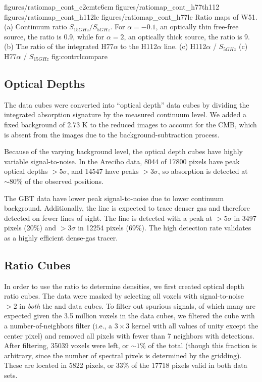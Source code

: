 \FigureFour
{figures/ratiomap_cont_c2cmtc6cm}
{figures/ratiomap_cont_h77th112}
{figures/ratiomap_cont_h112lc}
{figures/ratiomap_cont_h77lc}
{Ratio maps of W51.  
(a) Continuum ratio $S_{15 GHz} / S_{5 GHz}$.  For $\alpha=-0.1$, an optically
thin free-free source, the ratio is 0.9, while for $\alpha=2$, an optically thick source,
the ratio is 9.
(b) The ratio of the integrated H77$\alpha$ to the H112$\alpha$ line.
(c) H112$\alpha$ / $S_{5 GHz}$
(c) H77$\alpha$ / $S_{15 GHz}$
}
{fig:contrrlcompare}

\subsection{Optical Depths}

The data cubes were converted into ``optical depth'' data cubes by dividing the
integrated \formaldehyde absorption signature by the measured continuum level.
We added a fixed background of 2.73 K to the reduced images to account for the
CMB, which is absent from the images due to the background-subtraction
process.

Because of the varying background level, the optical depth cubes have highly
variable signal-to-noise.  In the Arecibo data, 8044 of 17800 pixels have peak
optical depths $>5\sigma$, and 14547 have peaks $>3\sigma$, so \formaldehyde
absorption is detected at $\sim80\%$ of the observed positions.

The GBT \formaldehyde \twotwo data have lower peak signal-to-noise due to lower
continuum background.  Additionally, the \twotwo line is expected to trace
denser gas and therefore detected on fewer lines of sight.  The \twotwo line is
detected with a peak at $>5\sigma$ in 3497 pixels (20\%) and $>3\sigma$ in
12254 pixels (69\%).  The high detection rate validates \formaldehyde as a
highly efficient dense-gas tracer.

\subsection{Ratio Cubes}
In order to use the \formaldehyde ratio to determine densities, we first
created optical depth ratio cubes.  The data were masked by selecting all
voxels with signal-to-noise $>2$ in  \emph{both} the \oneone and \twotwo data
cubes.  To filter out spurious signals, of which many are expected given the
3.5 million voxels in the data cubes, we filtered the cube with a
number-of-neighbors filter (i.e., a $3\times3$ kernel with all values of unity
except the center pixel) and removed all pixels with fewer than 7 neighbors
with detections.  After filtering, 35039 voxels were left, or $\sim 1\%$ of the
total (though this fraction is arbitrary, since the number of spectral pixels
is determined by the gridding).  These are located in 5822 pixels, or 33\% of
the 17718 pixels valid in both data sets.

